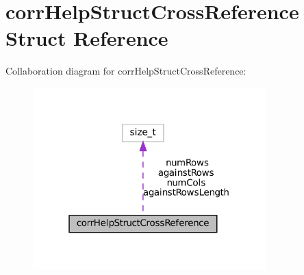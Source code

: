 \hypertarget{structcorrHelpStructCrossReference}{}\section{corr\+Help\+Struct\+Cross\+Reference Struct Reference}
\label{structcorrHelpStructCrossReference}


Collaboration diagram for corr\+Help\+Struct\+Cross\+Reference\+:\nopagebreak
\begin{figure}[H]
\begin{center}
\leavevmode
\includegraphics[width=256pt]{structcorrHelpStructCrossReference__coll__graph}
\end{center}
\end{figure}
